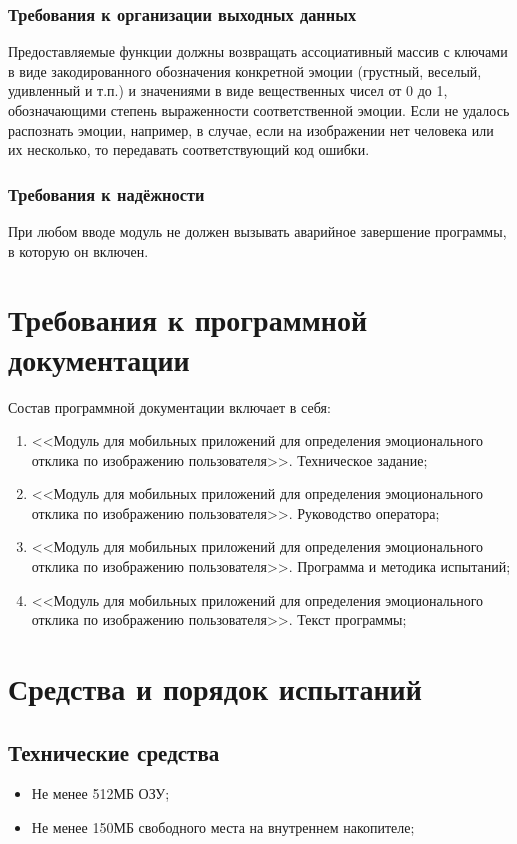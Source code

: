 \documentclass[a4paper,12pt]{article}
\begin{document}
    \subsubsection{Требования к организации выходных данных}
    Предоставляемые функции должны возвращать ассоциативный массив с ключами в виде закодированного обозначения конкретной эмоции (грустный, веселый, удивленный и т.п.) и значениями в виде вещественных чисел от 0 до 1, обозначающими степень выраженности соответственной эмоции. Если не удалось распознать эмоции, например, в случае, если на изображении нет человека или их несколько, то передавать соответствующий код ошибки.
    \subsubsection{Требования к надёжности}
    При любом вводе модуль не должен вызывать аварийное завершение программы, в которую он включен.

    \newpage

    \section{Требования к программной документации}
    Состав программной документации включает в себя:
    \begin{enumerate}
        \item <<Модуль для мобильных приложений для определения эмоционального отклика по изображению пользователя>>. Техническое задание;
        \item <<Модуль для мобильных приложений для определения эмоционального отклика по изображению пользователя>>. Руководство оператора;
        \item <<Модуль для мобильных приложений для определения эмоционального отклика по изображению пользователя>>. Программа и методика испытаний;
        \item <<Модуль для мобильных приложений для определения эмоционального отклика по изображению пользователя>>. Текст программы;
    \end{enumerate}

    \newpage

    \section{Средства и порядок испытаний}
    \subsection{Технические средства}
    \begin{itemize}
        \item Не менее 512МБ ОЗУ;
        \item Не менее 150МБ свободного места на внутреннем накопителе;
    \end{itemize}
\end{document}
